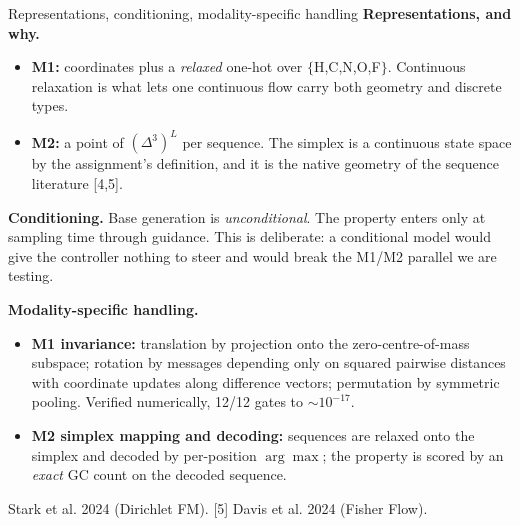 \documentclass[aspectratio=169,10pt]{beamer}
\newcommand{\theslidelabel}{}
\newcommand{\lbl}[1]{\renewcommand{\theslidelabel}{#1}}
\newcommand{\srcs}[1]{\vfill{\raggedleft\color{grayt}\fontsize{4.9}{5.6}\selectfont #1\par}}
\begin{document}
\lbl{1b}
\begin{frame}{Representations, conditioning, modality-specific handling}
  \textbf{Representations, and why.}
  \begin{itemize}\setlength\itemsep{0.1em}
    \item \textbf{M1:} coordinates plus a \emph{relaxed} one-hot over
      $\{$H,C,N,O,F$\}$. Continuous relaxation is what lets one continuous flow
      carry both geometry and discrete types.
    \item \textbf{M2:} a point of $(\Delta^3)^L$ per sequence. The simplex is a
      continuous state space by the assignment's definition, and it is the native
      geometry of the sequence literature [4,5].
  \end{itemize}

  \medskip
  \textbf{Conditioning.} Base generation is \emph{unconditional}. The property
  enters only at sampling time through guidance. This is deliberate: a conditional
  model would give the controller nothing to steer and would break the M1/M2
  parallel we are testing.

  \medskip
  \textbf{Modality-specific handling.}
  \begin{itemize}\setlength\itemsep{0.1em}
    \item \textbf{M1 invariance:} translation by projection onto the
      zero-centre-of-mass subspace; rotation by messages depending only on squared
      pairwise distances with coordinate updates along difference vectors;
      permutation by symmetric pooling. Verified numerically, 12/12 gates to
      $\sim10^{-17}$.
    \item \textbf{M2 simplex mapping and decoding:} sequences are relaxed onto the
      simplex and decoded by per-position $\arg\max$; the property is scored by an
      \emph{exact} GC count on the decoded sequence.
  \end{itemize}

  \srcs{[4] Stark et al. 2024 (Dirichlet FM). [5] Davis et al. 2024 (Fisher Flow).}
\end{frame}
\end{document}
